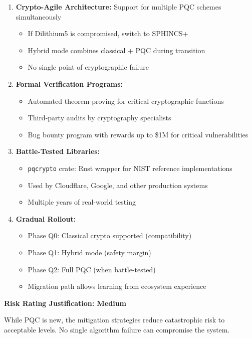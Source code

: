 \documentclass[11pt,a4paper]{article}
\begin{document}
\begin{enumerate}[leftmargin=*]
\item \textbf{Crypto-Agile Architecture:} Support for multiple PQC schemes simultaneously
\begin{itemize}
    \item If Dilithium5 is compromised, switch to SPHINCS+
    \item Hybrid mode combines classical + PQC during transition
    \item No single point of cryptographic failure
\end{itemize}

\item \textbf{Formal Verification Programs:}
\begin{itemize}
    \item Automated theorem proving for critical cryptographic functions
    \item Third-party audits by cryptography specialists
    \item Bug bounty program with rewards up to \$1M for critical vulnerabilities
\end{itemize}

\item \textbf{Battle-Tested Libraries:}
\begin{itemize}
    \item \texttt{pqcrypto} crate: Rust wrapper for NIST reference implementations
    \item Used by Cloudflare, Google, and other production systems
    \item Multiple years of real-world testing
\end{itemize}

\item \textbf{Gradual Rollout:}
\begin{itemize}
    \item Phase Q0: Classical crypto supported (compatibility)
    \item Phase Q1: Hybrid mode (safety margin)
    \item Phase Q2: Full PQC (when battle-tested)
    \item Migration path allows learning from ecosystem experience
\end{itemize}
\end{enumerate}

\textbf{Risk Rating Justification: Medium}

While PQC is new, the mitigation strategies reduce catastrophic risk to acceptable levels. No single algorithm failure can compromise the system.
\end{document}
